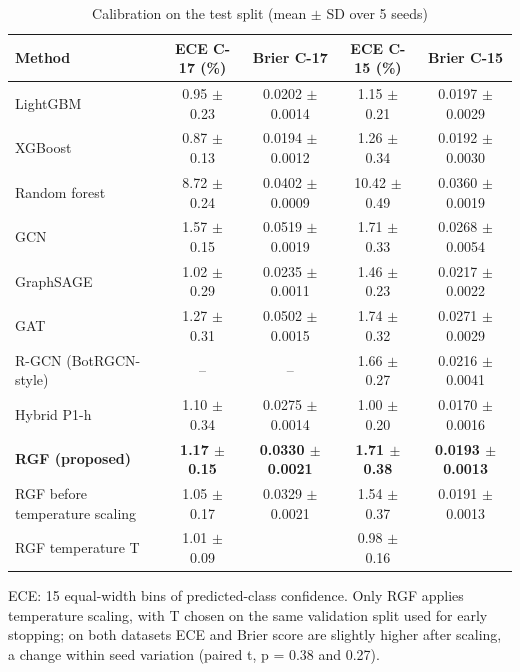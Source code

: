 \begin{table}[!t]
\caption{Calibration on the test split (mean $\pm$ SD over 5 seeds)}
\label{tab:calibration}
\centering\footnotesize
\setlength{\tabcolsep}{3pt}
\begin{tabular}{lcccc}
\hline
Method & ECE C-17 (\%) & Brier C-17 & ECE C-15 (\%) & Brier C-15 \\
\hline
LightGBM & 0.95 $\pm$ 0.23 & 0.0202 $\pm$ 0.0014 & 1.15 $\pm$ 0.21 & 0.0197 $\pm$ 0.0029 \\
XGBoost & 0.87 $\pm$ 0.13 & 0.0194 $\pm$ 0.0012 & 1.26 $\pm$ 0.34 & 0.0192 $\pm$ 0.0030 \\
Random forest & 8.72 $\pm$ 0.24 & 0.0402 $\pm$ 0.0009 & 10.42 $\pm$ 0.49 & 0.0360 $\pm$ 0.0019 \\
GCN & 1.57 $\pm$ 0.15 & 0.0519 $\pm$ 0.0019 & 1.71 $\pm$ 0.33 & 0.0268 $\pm$ 0.0054 \\
GraphSAGE & 1.02 $\pm$ 0.29 & 0.0235 $\pm$ 0.0011 & 1.46 $\pm$ 0.23 & 0.0217 $\pm$ 0.0022 \\
GAT & 1.27 $\pm$ 0.31 & 0.0502 $\pm$ 0.0015 & 1.74 $\pm$ 0.32 & 0.0271 $\pm$ 0.0029 \\
R-GCN (BotRGCN-style) & -- & -- & 1.66 $\pm$ 0.27 & 0.0216 $\pm$ 0.0041 \\
Hybrid P1-h & 1.10 $\pm$ 0.34 & 0.0275 $\pm$ 0.0014 & 1.00 $\pm$ 0.20 & 0.0170 $\pm$ 0.0016 \\
\textbf{RGF (proposed)} & \textbf{1.17 $\pm$ 0.15} & \textbf{0.0330 $\pm$ 0.0021} & \textbf{1.71 $\pm$ 0.38} & \textbf{0.0193 $\pm$ 0.0013} \\
RGF before temperature scaling & 1.05 $\pm$ 0.17 & 0.0329 $\pm$ 0.0021 & 1.54 $\pm$ 0.37 & 0.0191 $\pm$ 0.0013 \\
RGF temperature T & 1.01 $\pm$ 0.09 &  & 0.98 $\pm$ 0.16 &  \\
\hline
\end{tabular}
\par\smallskip\parbox{\linewidth}{\scriptsize ECE: 15 equal-width bins of predicted-class confidence. Only RGF applies temperature scaling, with T chosen on the same validation split used for early stopping; on both datasets ECE and Brier score are slightly higher after scaling, a change within seed variation (paired t, p = 0.38 and 0.27).}
\end{table}